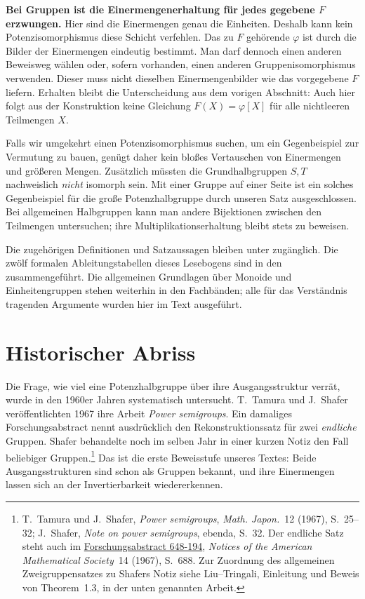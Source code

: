 \medskip\noindent\textbf{Bei Gruppen ist die Einermengenerhaltung
für jedes gegebene \(F\) erzwungen.}
Hier sind die Einermengen genau die Einheiten. Deshalb kann
kein Potenzisomorphismus diese Schicht verfehlen. Das zu
\(F\) gehörende \(\varphi\) ist durch die Bilder der
Einermengen eindeutig bestimmt. Man darf dennoch einen
anderen Beweisweg wählen oder, sofern vorhanden, einen
anderen Gruppenisomorphismus verwenden. Dieser muss nicht
dieselben Einermengenbilder wie das vorgegebene \(F\) liefern.
Erhalten bleibt die Unterscheidung aus dem vorigen Abschnitt:
Auch hier folgt aus der Konstruktion keine Gleichung
\(F(X)=\varphi[X]\) für alle nichtleeren Teilmengen \(X\).

Falls wir umgekehrt einen Potenzisomorphismus suchen, um
ein Gegenbeispiel zur Vermutung zu bauen, genügt daher
kein bloßes Vertauschen von Einermengen und größeren Mengen.
Zusätzlich müssten die Grundhalbgruppen \(S,T\) nachweislich
\emph{nicht} isomorph sein. Mit einer Gruppe auf einer Seite
ist ein solches Gegenbeispiel für die große Potenzhalbgruppe
durch unseren Satz ausgeschlossen. Bei allgemeinen
Halbgruppen kann man andere Bijektionen zwischen den
Teilmengen untersuchen; ihre Multiplikationserhaltung
bleibt stets zu beweisen.

Die zugehörigen Definitionen und Satzaussagen bleiben unter
\ReconstructionMainLink{} zugänglich. Die zwölf formalen
Ableitungstabellen dieses Lesebogens sind in den
\ReconstructionProofsLink{} zusammengeführt. Die allgemeinen
Grundlagen über Monoide und Einheitengruppen stehen weiterhin
in den Fachbänden; alle für das Verständnis tragenden
Argumente wurden hier im Text ausgeführt.

\clearpage
\section*{Historischer Abriss}
\hypertarget{reconstruction.reading.history}{}

Die Frage, wie viel eine Potenzhalbgruppe über ihre
Ausgangsstruktur verrät, wurde in den 1960er Jahren
systematisch untersucht. T.~Tamura und J.~Shafer
veröffentlichten 1967 ihre Arbeit \emph{Power semigroups}.
Ein damaliges Forschungsabstract nennt ausdrücklich den
Rekonstruktionssatz für zwei \emph{endliche} Gruppen.
Shafer behandelte noch im selben Jahr in einer kurzen
Notiz den Fall beliebiger Gruppen.\footnote{T.~Tamura und
J.~Shafer, \emph{Power semigroups}, \emph{Math. Japon.}~12
(1967), S.~25--32; J.~Shafer, \emph{Note on power semigroups},
ebenda, S.~32. Der endliche Satz steht auch im
\href{https://www.ams.org/journals/notices/196708/196708FullIssue.pdf}{Forschungsabstract 648-194},
\emph{Notices of the American Mathematical Society}~14 (1967),
S.~688. Zur Zuordnung des allgemeinen Zweigruppensatzes zu
Shafers Notiz siehe Liu--Tringali, Einleitung und Beweis von
Theorem~1.3, in der unten genannten Arbeit.}
Das ist die erste Beweisstufe unseres Textes: Beide
Ausgangsstrukturen sind schon als Gruppen bekannt, und
ihre Einermengen lassen sich an der Invertierbarkeit
wiedererkennen.

